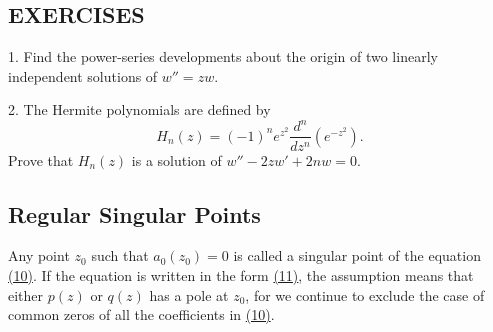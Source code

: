 \subsection*{EXERCISES}
1. Find the power-series developments about the origin of two linearly independent solutions of $w'' = zw$.

2. The Hermite polynomials are defined by
\begin{equation*}
H _ {n} (z) = (- 1) ^ {n} e ^ {z ^ {2}} \frac {d ^ {n}}{d z ^ {n}} \left(e ^ {- z ^ {2}}\right).
\end{equation*}
Prove that $H_{n}(z)$ is a solution of $w'' - 2zw' + 2nw = 0$.

\setcounter{section}{4}\setcounter{subsection}{1}\subsection{Regular Singular Points}\label{sec:8.4.2}
Any point $z_{0}$ such that $a_{0}(z_{0}) = 0$ is called a singular point of the equation \hyperref[eq:8.10]{(10)}. If the equation is written in the form \hyperref[eq:8.11]{(11)}, the assumption means that either $p(z)$ or $q(z)$ has a pole at $z_{0}$, for we continue to exclude the case of common zeros of all the coefficients in \hyperref[eq:8.10]{(10)}.

